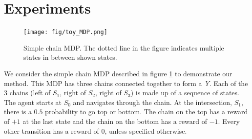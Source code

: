 \section{Experiments}
\begin{figure}[h]
    \centering
    \texttt{[image: fig/toy\_MDP.png]}
    \caption{Simple chain MDP. The dotted line in the figure indicates multiple states in between shown states.}
    \label{fig:toy MDP}
\end{figure}
We consider the simple chain MDP described in figure \ref{fig:toy MDP} to demonstrate our method. This MDP has three chains connected together to form a \emph{Y}. Each of the 3 chains (left of $S_1$, right of $S_2$, right of $S_3$) is made up of a sequence of states. The agent starts at $S_0$ and navigates through the chain. At the intersection, $S_1$, there is a $0.5$ probability to go top or bottom. The chain on the top has a reward of $+1$ at the last state and the chain on the bottom has a reward of $-1$. Every other transition has a reward of $0$, unless specified otherwise.\\
